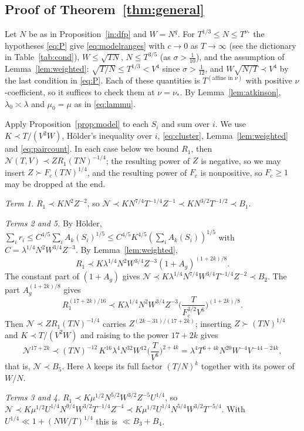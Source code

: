 \documentclass[11pt]{amsart}
\theoremstyle{definition}
\theoremstyle{remark}
\numberwithin{equation}{section}
\newcommand{\cN}{\mathcal{N}}
\begin{document}
\subsection{Proof of Theorem~\ref{thm:general}}
Let $N$ be as in Proposition~\ref{in:dfp} and $W=N^q$. For $T^{1/3}\le N\le T^{\nu_*}$ the hypotheses \eqref{eq:P} give \eqref{eq:modelranges} with $c\to0$ as $T\to\infty$ (see the dictionary in Table~\ref{tab:cond}), $W\le\sqrt{TN}$, $N\le T^{3/5}$ (as $\sigma>\frac1{10}$), and the assumption of Lemma~\ref{lem:weighted}: $\sqrt{T/N}\le T^{1/3}<V^4$ since $\sigma>\frac1{12}$, and $W\sqrt{N/T}\prec V^4$ by the last condition in \eqref{eq:P}. Each of these quantities is $T^{(\text{affine in }\nu)}$ with positive $\nu$-coefficient, so it suffices to check them at $\nu=\nu_*$. By Lemma~\ref{lem:atkinson}, $\lambda_0\asymp\lambda$ and $\mu_0=\mu$ as in \eqref{eq:lammu}.

Apply Proposition~\ref{prop:model} to each $S_i$ and sum over $i$. We use $K\prec T/(V^2W)$, H\"older's inequality over $i$, \eqref{eq:cluster}, Lemma~\ref{lem:weighted} and \eqref{eq:paircount}. In each case below we bound $R_1$, then $\cN(T,V)\prec ZR_1(TN)^{-1/4}$; the resulting power of $Z$ is negative, so we may insert $Z\succ F_c(TN)^{1/4}$, and the resulting power of $F_c$ is nonpositive, so $F_c\ge1$ may be dropped at the end.

\emph{Term 1.} $R_1\prec KN^2Z^{-2}$, so $\cN\prec KN^{7/4}T^{-1/4}Z^{-1}\prec KN^{3/2}T^{-1/2}\prec B_1$.

\emph{Terms 2 and 5.} By H\"older, $\sum_ir_i\le C^{4/5}\sum_iA_k(S_i)^{1/5}\le C^{4/5}K^{4/5}(\sum_iA_k(S_i))^{1/5}$ with $C=\lambda^{1/4}N^2W^{3/4}Z^{-3}$. By Lemma~\ref{lem:weighted},
\[
R_1\prec K\lambda^{1/4}N^2W^{3/4}Z^{-3}(1+A_g)^{(1+2k)/8}.
\]
The constant part of $(1+A_g)$ gives $\cN\prec K\lambda^{1/4}N^{7/4}W^{3/4}T^{-1/4}Z^{-2}\prec B_2$. The part $A_g^{(1+2k)/8}$ gives
\[
R_1^{(17+2k)/16}\prec K\lambda^{1/4}N^2W^{3/4}Z^{-3}\Big(\frac T{F_c^{3/2}V^6}\Big)^{(1+2k)/8}.
\]
Then $\cN\prec ZR_1(TN)^{-1/4}$ carries $Z^{(2k-31)/(17+2k)}$; inserting $Z\succ(TN)^{1/4}$ and $K\prec T/(V^2W)$ and raising to the power $17+2k$ gives
\[
\cN^{17+2k}\prec(TN)^{-12}\,K^{16}\lambda^4N^{32}W^{12}\Big(\frac T{V^6}\Big)^{2+4k}=\lambda^4T^{6+4k}N^{20}W^{-4}V^{-44-24k},
\]
that is, $\cN\prec B_5$. Here $\lambda$ keeps its full factor $(T/N)^k$ together with its power of $W/N$.

\emph{Terms 3 and 4.} $R_1\prec K\mu^{1/2}N^{5/2}W^{3/2}Z^{-5}U^{1/4}$, so $\cN\prec K\mu^{1/2}U^{1/4}N^{9/4}W^{3/2}T^{-1/4}Z^{-4}\prec K\mu^{1/2}U^{1/4}N^{5/4}W^{3/2}T^{-5/4}$. With $U^{1/4}\ll1+(NW/T)^{1/4}$ this is $\ll B_3+B_4$.
\end{document}
